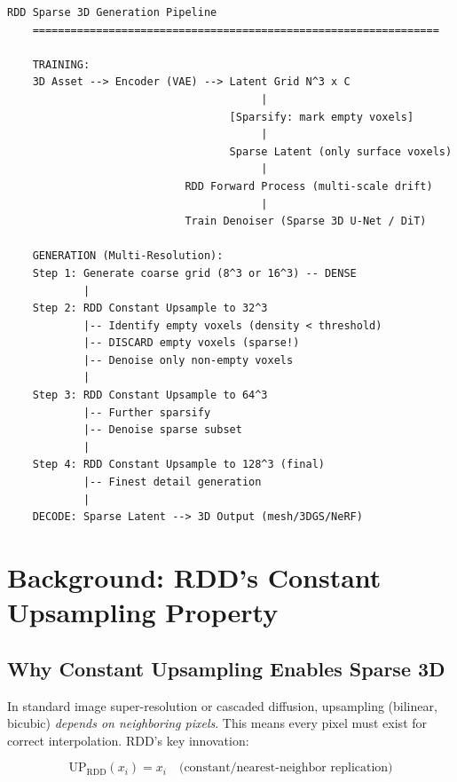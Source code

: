 \documentclass[11pt, a4paper]{article}
\begin{document}
\begin{lstlisting}[style=flowchart, caption={Proposed Sparse RDD-3D Pipeline}]
                    RDD Sparse 3D Generation Pipeline
    ================================================================
    
    TRAINING:
    3D Asset --> Encoder (VAE) --> Latent Grid N^3 x C
                                        |
                                   [Sparsify: mark empty voxels]
                                        |
                                   Sparse Latent (only surface voxels)
                                        |
                            RDD Forward Process (multi-scale drift)
                                        |
                            Train Denoiser (Sparse 3D U-Net / DiT)
    
    GENERATION (Multi-Resolution):
    Step 1: Generate coarse grid (8^3 or 16^3) -- DENSE
            |
    Step 2: RDD Constant Upsample to 32^3
            |-- Identify empty voxels (density < threshold)
            |-- DISCARD empty voxels (sparse!)
            |-- Denoise only non-empty voxels
            |
    Step 3: RDD Constant Upsample to 64^3
            |-- Further sparsify
            |-- Denoise sparse subset
            |
    Step 4: RDD Constant Upsample to 128^3 (final)
            |-- Finest detail generation
            |
    DECODE: Sparse Latent --> 3D Output (mesh/3DGS/NeRF)
\end{lstlisting}

\section{Background: RDD's Constant Upsampling Property}

\subsection{Why Constant Upsampling Enables Sparse 3D}

In standard image super-resolution or cascaded diffusion, upsampling (bilinear, bicubic) \emph{depends on neighboring pixels}. This means every pixel must exist for correct interpolation. RDD's key innovation:

\begin{equation}
    \boxed{\text{UP}_{\text{RDD}}(x_i) = x_i \quad \text{(constant/nearest-neighbor replication)}}
\end{equation}
\end{document}

